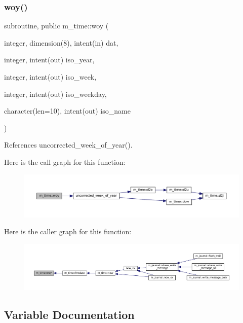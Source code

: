 \subsubsection{\texorpdfstring{woy()}{woy()}}
{\footnotesize\ttfamily subroutine, public m\+\_\+time\+::woy (\begin{DoxyParamCaption}\item[{integer, dimension(8), intent(in)}]{dat,  }\item[{integer, intent(out)}]{iso\+\_\+year,  }\item[{integer, intent(out)}]{iso\+\_\+week,  }\item[{integer, intent(out)}]{iso\+\_\+weekday,  }\item[{character(len=10), intent(out)}]{iso\+\_\+name }\end{DoxyParamCaption})}



References uncorrected\+\_\+week\+\_\+of\+\_\+year().

Here is the call graph for this function\+:\nopagebreak
\begin{figure}[H]
\begin{center}
\leavevmode
\includegraphics[width=350pt]{namespacem__time_aea9216971a364d79beb307f36e9e3873_cgraph}
\end{center}
\end{figure}
Here is the caller graph for this function\+:\nopagebreak
\begin{figure}[H]
\begin{center}
\leavevmode
\includegraphics[width=350pt]{namespacem__time_aea9216971a364d79beb307f36e9e3873_icgraph}
\end{center}
\end{figure}


\subsection{Variable Documentation}
\mbox{\label{namespacem__time_a95f16e7435244d114f0a451625dc189a}} 
